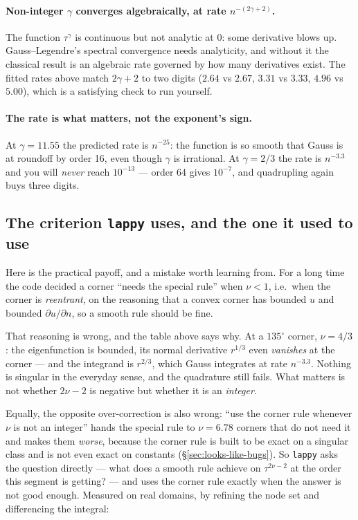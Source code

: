 \documentclass[11pt]{article}
\theoremstyle{definition}
\theoremstyle{remark}
\newcommand{\code}[1]{\texttt{#1}}
\begin{document}
\paragraph{Non-integer $\gamma$ converges algebraically, at rate $n^{-(2\gamma+2)}$.}
The function $\tau^\gamma$ is continuous but not analytic at $0$: some derivative
blows up. Gauss--Legendre's spectral convergence needs analyticity, and without
it the classical result is an algebraic rate governed by how many derivatives
exist. The fitted rates above match $2\gamma+2$ to two digits ($2.64$ vs $2.67$,
$3.31$ vs $3.33$, $4.96$ vs $5.00$), which is a satisfying check to run yourself.

\paragraph{The rate is what matters, not the exponent's sign.} At
$\gamma=11.55$ the predicted rate is $n^{-25}$: the function is so smooth that
Gauss is at roundoff by order 16, even though $\gamma$ is irrational. At
$\gamma=2/3$ the rate is $n^{-3.3}$ and you will \emph{never} reach $10^{-13}$
--- order 64 gives $10^{-7}$, and quadrupling again buys three digits.

\subsection{The criterion \texttt{lappy} uses, and the one it used to use}

Here is the practical payoff, and a mistake worth learning from. For a long time
the code decided a corner ``needs the special rule'' when $\nu<1$, i.e.\ when the
corner is \emph{reentrant}, on the reasoning that a convex corner has bounded $u$
and bounded $\partial u/\partial n$, so a smooth rule should be fine.

That reasoning is wrong, and the table above says why. At a $135^\circ$ corner,
$\nu=4/3$: the eigenfunction is bounded, its normal derivative $r^{1/3}$ even
\emph{vanishes} at the corner --- and the integrand is $r^{2/3}$, which Gauss
integrates at rate $n^{-3.3}$. Nothing is singular in the everyday sense, and the
quadrature still fails. What matters is not whether $2\nu-2$ is negative but
whether it is an \emph{integer}.

Equally, the opposite over-correction is also wrong: ``use the corner rule
whenever $\nu$ is not an integer'' hands the special rule to $\nu=6.78$ corners
that do not need it and makes them \emph{worse}, because the corner rule is built
to be exact on a singular class and is not even exact on constants
(\S\ref{sec:looks-like-bugs}). So \code{lappy} asks the question directly ---
what does a smooth rule achieve on $\tau^{2\nu-2}$ at the order this segment is
getting? --- and uses the corner rule exactly when the answer is not good enough.
Measured on real domains, by refining the node set and differencing the integral:
\end{document}
